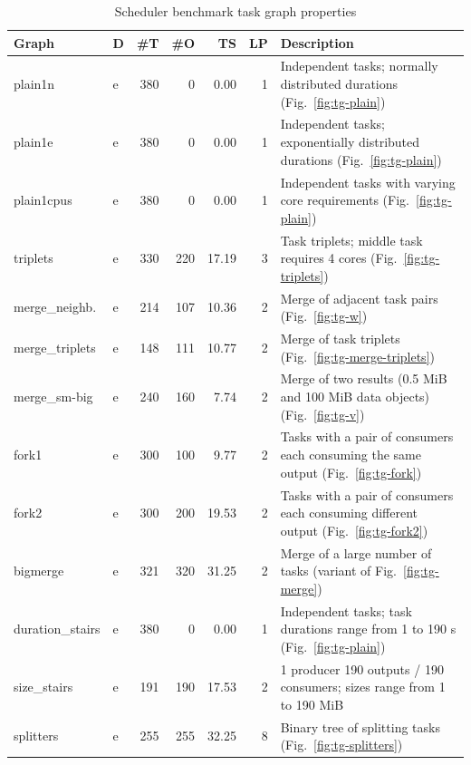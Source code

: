 \begin{table}
	\caption{Scheduler benchmark task graph properties}
	\centering
	\label{tab:estee-graph-properties}
	\begin{tabular}{l|lrrrr|T}
		\toprule
		Graph & D &   \#T &     \#O & TS &   LP & \normalsize{Description} \\
		\midrule
		plain1n &   e &  380 &      0 &    0.00 &    1 &   Independent tasks;
		normally distributed durations (Fig.~\ref{fig:tg-plain}) \\
		plain1e &   e &  380 &      0 &    0.00 &    1 &    Independent tasks;
		exponentially distributed durations (Fig.~\ref{fig:tg-plain}) \\
		plain1cpus &   e &  380 &      0 &    0.00 &    1 &  Independent tasks with
		varying core requirements (Fig.~\ref{fig:tg-plain}) \\
		triplets &   e &  330 &    220 &   17.19 &    3 & Task triplets; middle
		task requires 4 cores (Fig.~\ref{fig:tg-triplets}) \\
		merge\_neighb. &   e &  214 &    107 &   10.36 &    2 & Merge of adjacent
		task pairs (Fig.~\ref{fig:tg-w}) \\
		merge\_triplets &   e &  148 &    111 &   10.77 &    2 & Merge of task
		triplets (Fig.~\ref{fig:tg-merge-triplets}) \\
		merge\_sm-big &   e &  240 &    160 &    7.74 &    2 &  Merge of two
		results (0.5 MiB and 100 MiB data objects) (Fig.~\ref{fig:tg-v}) \\
		fork1 &   e &  300 &    100 &    9.77 &    2 &      Tasks with a pair of
		consumers each consuming the same output (Fig.~\ref{fig:tg-fork})  \\
		fork2 &   e &  300 &    200 &   19.53 &    2 &      Tasks with a pair of
		consumers each consuming different output (Fig.~\ref{fig:tg-fork2}) \\
		bigmerge &   e &  321 &    320 &   31.25 &    2 &    Merge of a large
		number of tasks (variant of Fig.~\ref{fig:tg-merge}) \\
		duration\_stairs &   e &  380 &      0 &    0.00 &    1 &    Independent
		tasks; task durations range from 1 to 190 s (Fig.~\ref{fig:tg-plain}) \\
		size\_stairs &   e &  191 &    190 &   17.53 &    2 &  1 producer 190
		outputs / 190 consumers; sizes range from 1 to 190 MiB \\
		splitters &   e &  255 &    255 &   32.25 &    8 &  Binary tree of
		splitting tasks (Fig.~\ref{fig:tg-splitters}) \\

\end{tabular}
\end{table}
